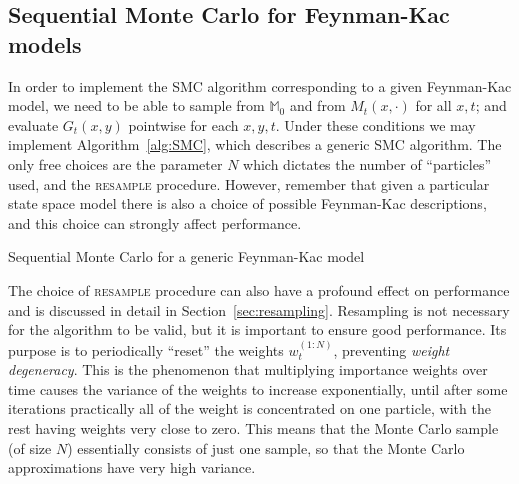 \subsection{Sequential Monte Carlo for Feynman-Kac models}
\label{sec:SMC_FK}
In order to implement the SMC algorithm corresponding to a given Feynman-Kac model, we need to be able to sample from $\mathbb{M}_0$ and from $M_t(x, \cdot)$ for all $x,t$; and evaluate $G_t(x, y)$ pointwise for each $x,y, t$.
Under these conditions we may implement Algorithm~\ref{alg:SMC}, which describes a generic SMC algorithm. 
The only free choices are the parameter $N$ which dictates the number of ``particles'' used, and the \textsc{resample} procedure.
However, remember that given a particular state space model there is also a choice of possible Feynman-Kac descriptions, and this choice can strongly affect performance.

\begin{algorithm}[ht]
\vspace*{10pt}
\DontPrintSemicolon
{}
\vspace*{10pt}
\caption{Sequential Monte Carlo for a generic Feynman-Kac model}
\label{alg:SMC}
\end{algorithm}

The choice of \textsc{resample} procedure can also have a profound effect on performance and is discussed in detail in Section~\ref{sec:resampling}. 
Resampling is not necessary for the algorithm to be valid, but it is important to ensure good performance. Its purpose is to periodically ``reset'' the weights $w_t^{(1:N)}$, preventing \emph{weight degeneracy}. This is the phenomenon that multiplying importance weights over time causes the variance of the weights to increase exponentially, until after some iterations practically all of the weight is concentrated on one particle, with the rest having weights very close to zero. This means that the Monte Carlo sample (of size $N$) essentially consists of just one sample, so that the Monte Carlo approximations have very high variance.


